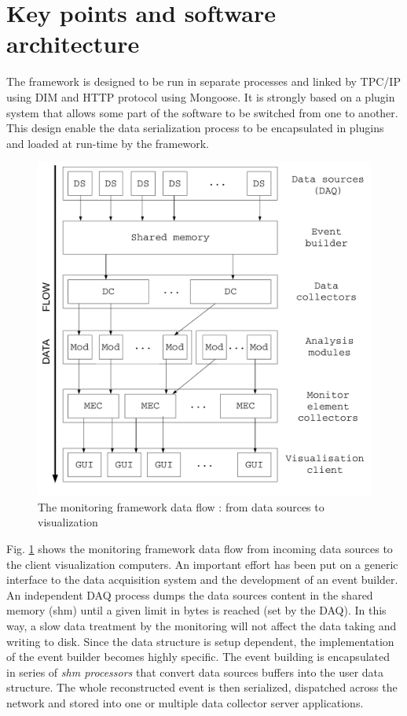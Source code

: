 \documentclass[conference]{IEEEtran}
\begin{document}
\section{Key points and software architecture}

The framework is designed to be run in separate processes and linked by TPC/IP using DIM\cite{dim1993distributed} and HTTP protocol using Mongoose\cite{MONGOOSE}. It is strongly based on a plugin system that allows some part of the software to be switched from one to another. This design enable the data serialization process to be encapsulated in plugins and loaded at run-time by the framework.

\begin{figure}[htbp]
  \includegraphics[width=\linewidth]{DQMWorkflow.pdf}
  \caption{\label{DQM_WORKFLOW}The monitoring framework data flow : from data sources to visualization}
\end{figure}

Fig. \ref{DQM_WORKFLOW} shows the monitoring framework data flow from incoming data sources to the client visualization computers. An important effort has been put on a generic interface to the data acquisition system and the development of an event builder. An independent DAQ process dumps the data sources content in the shared memory (shm) until a given limit in bytes is reached (set by the DAQ). In this way, a slow data treatment by the monitoring will not affect the data taking and writing to disk. Since the data structure is setup dependent, the implementation of the event builder becomes highly specific. The event building is encapsulated in series of \textit{shm processors} that convert data sources buffers into the user data structure. The whole reconstructed event is then serialized, dispatched across the network and stored into one or multiple data collector server applications.
\end{document}
